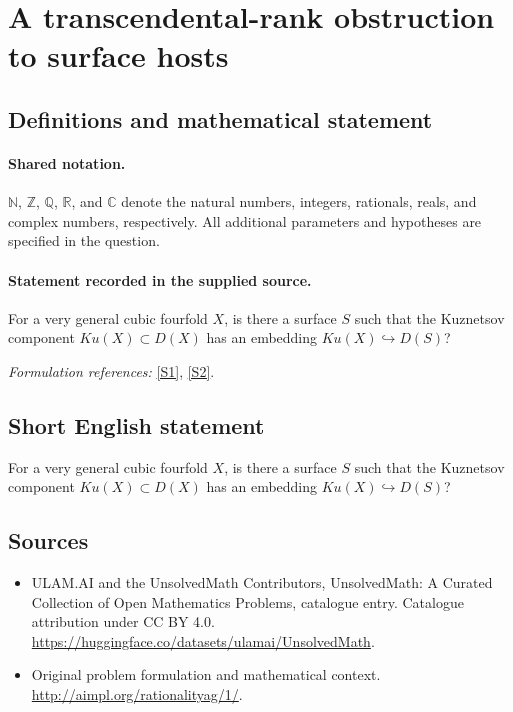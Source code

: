 \documentclass[11pt]{article}
\newcommand{\sref}[2]{\hyperlink{source:#1:#2}{[S#2]}}
\begin{document}
\section{A transcendental-rank obstruction to surface hosts}\label{statement}

\subsection{Definitions and mathematical statement}

\paragraph{Shared notation.}$\mathbb N$, $\mathbb Z$, $\mathbb Q$, $\mathbb R$, and $\mathbb C$ denote the natural numbers, integers, rationals, reals, and complex numbers, respectively. All additional parameters and hypotheses are specified in the question.


\paragraph{Statement recorded in the supplied source.}
For a very general cubic fourfold $X$, is there a surface $S$ such that the Kuznetsov component $Ku(X) \subset D(X)$ has an embedding $Ku(X) \hookrightarrow D(S)$?
\par\smallskip\textit{Formulation references:} \sref{statement}{1}, \sref{statement}{2}.
\subsection{Short English statement}
For a very general cubic fourfold $X$, is there a surface $S$ such that the Kuznetsov component $Ku(X) \subset D(X)$ has an embedding $Ku(X) \hookrightarrow D(S)$?
\subsection{Sources}
\begin{itemize}
\item[\hypertarget{source:statement:1}{S1}] ULAM.AI and the UnsolvedMath Contributors, UnsolvedMath: A Curated Collection of Open Mathematics Problems, catalogue entry. Catalogue attribution under CC BY 4.0.
\url{https://huggingface.co/datasets/ulamai/UnsolvedMath}.
\item[\hypertarget{source:statement:2}{S2}] Original problem formulation and mathematical context.
\url{http://aimpl.org/rationalityag/1/}.
\end{itemize}
\label{end:statement}
\end{document}
